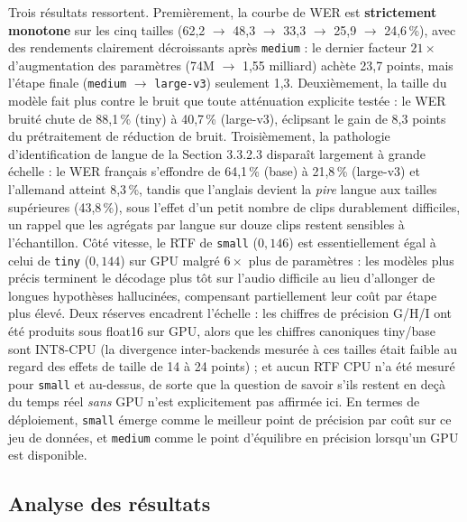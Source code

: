 \documentclass[12pt]{report}
\begin{document}
Trois résultats ressortent. Premièrement, la courbe de WER est \textbf{strictement monotone} sur les cinq tailles (62,2 $\to$ 48,3 $\to$ 33,3 $\to$ 25,9 $\to$ 24,6\,\%), avec des rendements clairement décroissants après \texttt{medium} : le dernier facteur $21\times$ d'augmentation des paramètres (74M $\to$ 1,55 milliard) achète 23,7 points, mais l'étape finale (\texttt{medium} $\to$ \texttt{large-v3}) seulement 1,3. Deuxièmement, la taille du modèle fait plus contre le bruit que toute atténuation explicite testée : le WER bruité chute de 88,1\,\% (tiny) à 40,7\,\% (large-v3), éclipsant le gain de 8,3 points du prétraitement de réduction de bruit. Troisièmement, la pathologie d'identification de langue de la Section 3.3.2.3 disparaît largement à grande échelle : le WER français s'effondre de 64,1\,\% (base) à 21,8\,\% (large-v3) et l'allemand atteint 8,3\,\%, tandis que l'anglais devient la \emph{pire} langue aux tailles supérieures (43,8\,\%), sous l'effet d'un petit nombre de clips durablement difficiles, un rappel que les agrégats par langue sur douze clips restent sensibles à l'échantillon. Côté vitesse, le RTF de \texttt{small} ($0{,}146$) est essentiellement égal à celui de \texttt{tiny} ($0{,}144$) sur GPU malgré $6\times$ plus de paramètres : les modèles plus précis terminent le décodage plus tôt sur l'audio difficile au lieu d'allonger de longues hypothèses hallucinées, compensant partiellement leur coût par étape plus élevé. Deux réserves encadrent l'échelle : les chiffres de précision G/H/I ont été produits sous float16 sur GPU, alors que les chiffres canoniques tiny/base sont INT8-CPU (la divergence inter-backends mesurée à ces tailles était faible au regard des effets de taille de 14 à 24 points) ; et aucun RTF CPU n'a été mesuré pour \texttt{small} et au-dessus, de sorte que la question de savoir s'ils restent en deçà du temps réel \emph{sans} GPU n'est explicitement pas affirmée ici. En termes de déploiement, \texttt{small} émerge comme le meilleur point de précision par coût sur ce jeu de données, et \texttt{medium} comme le point d'équilibre en précision lorsqu'un GPU est disponible.
\subsection{Analyse des résultats}
\end{document}
